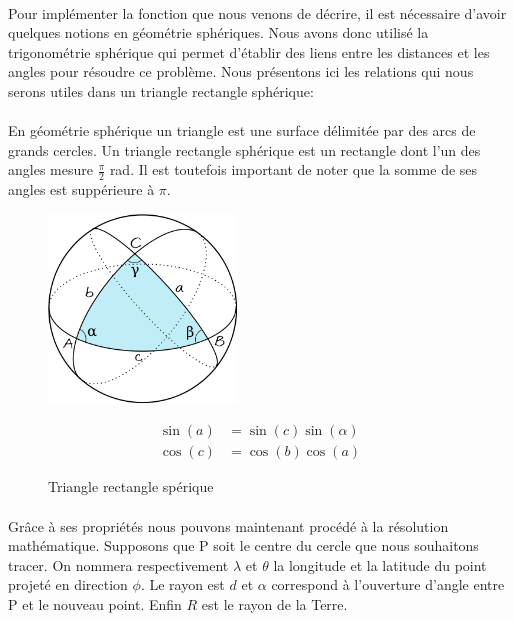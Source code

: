 \documentclass[a4paper]{report}
\begin{document}
\paragraph{} Pour implémenter la fonction que nous venons de décrire, il est nécessaire d'avoir quelques notions en géométrie sphériques. Nous avons donc utilisé la trigonométrie sphérique qui permet d'établir des liens entre les distances et les angles pour résoudre ce problème. Nous présentons ici les relations qui nous serons utiles dans un triangle rectangle sphérique:

\paragraph{} En géométrie sphérique un triangle est une surface délimitée par des arcs de grands cercles. Un triangle rectangle sphérique est un rectangle dont l'un des angles mesure $\frac{\pi}{2}$ rad. Il est toutefois important de noter que la somme de ses angles est suppérieure à $\pi$.

\begin{figure}[H]
	\begin{minipage}[c]{.46\linewidth}
		\begin{center}
			\includegraphics[width=5cm]{image/sprint2_triangles_spheriques}
       			\caption{Triangle rectangle spérique}
			\label{Triangle rectangle spérique}
		\end{center}
	\end{minipage} \hfill
	\begin{minipage}[c]{.46\linewidth}
		\begin{align}
			\sin(a)&=\sin(c)\sin(\alpha) \\
			\cos(c)&=\cos(b)\cos(a) 
		\end{align}
	\end{minipage}
\end{figure}

\paragraph{} Grâce à ses propriétés nous pouvons maintenant procédé à la résolution mathématique. Supposons que P soit le centre du cercle que nous souhaitons tracer. On nommera respectivement $\lambda$ et $\theta$ la longitude et la latitude du point projeté en direction $\phi$. Le rayon est $d$ et $\alpha$ correspond à l'ouverture d'angle entre P et le nouveau point. Enfin $R$ est le rayon de la Terre.
\end{document}
